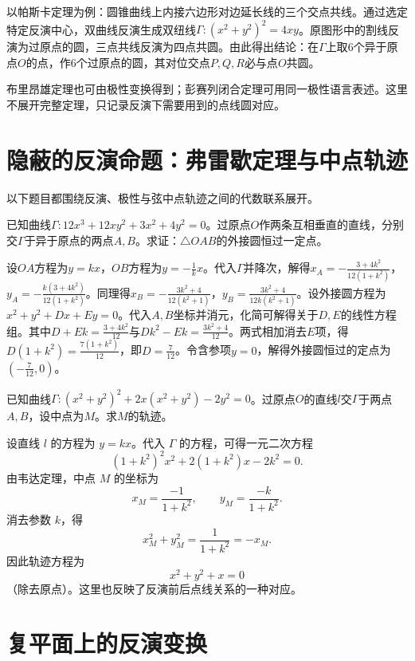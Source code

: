 以帕斯卡定理为例：圆锥曲线上内接六边形对边延长线的三个交点共线。通过选定特定反演中心，双曲线反演生成双纽线$\Gamma: (x^2+y^2)^2 = 4xy$。原图形中的割线反演为过原点的圆，三点共线反演为四点共圆。由此得出结论：在$\Gamma$上取$6$个异于原点$O$的点，作$6$个过原点的圆，其对位交点$P, Q, R$必与点$O$共圆。

布里昂雄定理也可由极性变换得到；彭赛列闭合定理可用同一极性语言表述。这里不展开完整定理，只记录反演下需要用到的点线圆对应。

\section{隐蔽的反演命题：弗雷歇定理与中点轨迹}

以下题目都围绕反演、极性与弦中点轨迹之间的代数联系展开。

\begin{example}
已知曲线$\Gamma: 12x^3 + 12xy^2 + 3x^2 + 4y^2 = 0$。过原点$O$作两条互相垂直的直线，分别交$\Gamma$于异于原点的两点$A, B$。求证：$\triangle OAB$的外接圆恒过一定点。
\end{example}
\begin{solution}
设$OA$方程为$y = kx$，$OB$方程为$y = -\frac{1}{k}x$。代入$\Gamma$并降次，解得$x_A = -\frac{3+4k^2}{12(1+k^2)}$，$y_A = -\frac{k(3+4k^2)}{12(1+k^2)}$。同理得$x_B = -\frac{3k^2+4}{12(k^2+1)}$，$y_B = \frac{3k^2+4}{12k(k^2+1)}$。设外接圆方程为$x^2 + y^2 + Dx + Ey = 0$。代入$A, B$坐标并消元，化简可解得关于$D, E$的线性方程组。其中$D + Ek = \frac{3+4k^2}{12}$与$Dk^2 - Ek = \frac{3k^2+4}{12}$。两式相加消去$E$项，得$D(1+k^2) = \frac{7(1+k^2)}{12}$，即$D = \frac{7}{12}$。令含参项$y=0$，解得外接圆恒过的定点为$\left(-\frac{7}{12}, 0\right)$。
\end{solution}

\begin{example}
已知曲线$\Gamma: (x^2+y^2)^2 + 2x(x^2+y^2) - 2y^2 = 0$。过原点$O$的直线$l$交$\Gamma$于两点$A, B$，设中点为$M$。求$M$的轨迹。
\end{example}
\begin{solution}
设直线 $l$ 的方程为 $y = kx$。代入 $\Gamma$ 的方程，可得一元二次方程
\[
(1+k^2)^2x^2+2(1+k^2)x-2k^2=0.
\]
由韦达定理，中点 $M$ 的坐标为
\[
x_M=\frac{-1}{1+k^2},\qquad y_M=\frac{-k}{1+k^2}.
\]
消去参数 $k$，得
\[
x_M^2+y_M^2=\frac{1}{1+k^2}=-x_M.
\]
因此轨迹方程为
\[
x^2+y^2+x=0
\]
（除去原点）。这里也反映了反演前后点线关系的一种对应。
\end{solution}

\section{复平面上的反演变换}

